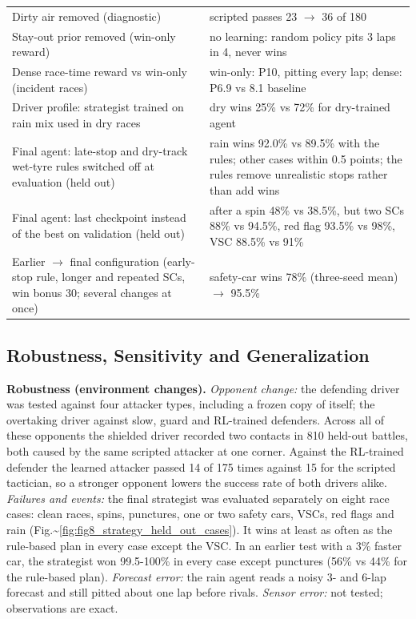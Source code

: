 \documentclass{ieeeaccess}
\begin{document}
\begin{table}[!t]
\begin{tabularx}{\textwidth}{>{\raggedright\arraybackslash}X>{\raggedright\arraybackslash}X}
Dirty air removed (diagnostic) & scripted passes 23 \ensuremath{\rightarrow} 36 of 180 \\
Stay-out prior removed (win-only reward) & no learning: random policy pits 3 laps in 4, never wins \\
Dense race-time reward vs win-only (incident races) & win-only: P10, pitting every lap; dense: P6.9 vs 8.1 baseline \\
Driver profile: strategist trained on rain mix used in dry races & dry wins 25\% vs 72\% for dry-trained agent \\
Final agent: late-stop and dry-track wet-tyre rules switched off at evaluation (held out) & rain wins 92.0\% vs 89.5\% with the rules; other cases within 0.5 points; the rules remove unrealistic stops rather than add wins \\
Final agent: last checkpoint instead of the best on validation (held out) & after a spin 48\% vs 38.5\%, but two SCs 88\% vs 94.5\%, red flag 93.5\% vs 98\%, VSC 88.5\% vs 91\% \\
Earlier \ensuremath{\rightarrow} final configuration (early-stop rule, longer and repeated SCs, win bonus 30; several changes at once) & safety-car wins 78\% (three-seed mean) \ensuremath{\rightarrow} 95.5\% \\
\hline
\end{tabularx}
\end{table}

\subsection{Robustness, Sensitivity and Generalization}

\textbf{Robustness (environment changes).}
\emph{Opponent change:} the defending driver was tested against four attacker types,
including a frozen copy of itself; the overtaking driver against slow, guard and
RL-trained defenders. Across all of these opponents the shielded driver recorded
two contacts in 810 held-out battles, both caused by the same scripted attacker at
one corner. Against the RL-trained defender the learned attacker passed 14 of 175
times against 15 for the scripted tactician, so a stronger opponent lowers the
success rate of both drivers alike.
\emph{Failures and events:} the final strategist was evaluated separately on eight race
cases: clean races, spins, punctures, one or two safety cars, VSCs, red flags and
rain (Fig.\textasciitilde{}\ref{fig:fig8_strategy_held_out_cases}). It wins at least as often as the rule-based plan in every case
except the VSC. In an earlier test with a 3\% faster car, the strategist won
99.5-100\% in every case except punctures (56\% vs 44\% for the rule-based plan).
\emph{Forecast error:} the rain agent reads a noisy 3- and 6-lap forecast and still
pitted about one lap before rivals.
\emph{Sensor error:} not tested; observations are exact.
\end{document}
